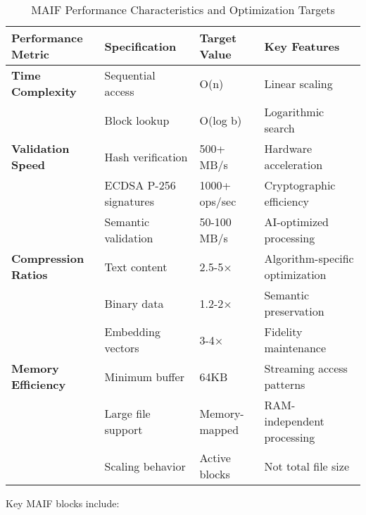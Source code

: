 \documentclass[conference]{IEEEtran}
\begin{document}
\begin{table*}[!t]
\renewcommand{\arraystretch}{1.3}
\caption{MAIF Performance Characteristics and Optimization Targets}
\label{tab:performance-characteristics}
\centering
\footnotesize
\begin{tabular}{p{3.5cm}p{4cm}p{3cm}p{3.5cm}}
\toprule
\textbf{Performance Metric} & \textbf{Specification} & \textbf{Target Value} & \textbf{Key Features} \\
\midrule
\textbf{Time Complexity} & Sequential access & O(n) & Linear scaling \\
& Block lookup & O(log b) & Logarithmic search \\
\midrule
\textbf{Validation Speed} & Hash verification & 500+ MB/s & Hardware acceleration \\
& ECDSA P-256 signatures & 1000+ ops/sec & Cryptographic efficiency \\
& Semantic validation & 50-100 MB/s & AI-optimized processing \\
\midrule
\textbf{Compression Ratios} & Text content & 2.5-5× & Algorithm-specific optimization \\
& Binary data & 1.2-2× & Semantic preservation \\
& Embedding vectors & 3-4× & Fidelity maintenance \\
\midrule
\textbf{Memory Efficiency} & Minimum buffer & 64KB & Streaming access patterns \\
& Large file support & Memory-mapped & RAM-independent processing \\
& Scaling behavior & Active blocks & Not total file size \\
\bottomrule
\end{tabular}
\end{table*}

Key MAIF blocks include:
\end{document}
